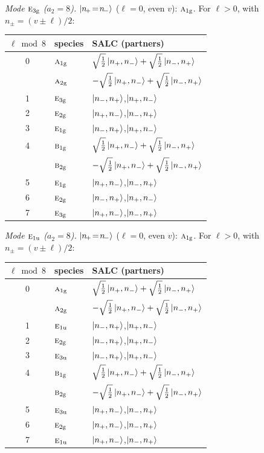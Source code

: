 \documentclass[11pt]{article}
\newcommand{\irr}[1]{\text{\normalfont\scshape #1}}
\newcommand{\ptag}[1]{\mathrm{#1}}
\begin{document}
\emph{Mode $\irr{e}_{3\ptag{g}}$ ($a_2=8$).} $\ket{n_{\!+}\!=\!n_{\!-}}$ ($\ell=0$, even $v$): $\irr{a}_{1\ptag{g}}$. For $\ell>0$, with $n_\pm=(v\pm\ell)/2$:
\begin{longtable}{c l l}\hline $\ell\bmod 8$ & species & SALC (partners)\\ \hline\endhead
0 & $\irr{a}_{1\ptag{g}}$ & $\sqrt{\tfrac{1}{2}}\ket{n_+,n_-}+\sqrt{\tfrac{1}{2}}\ket{n_-,n_+}$\\
 & $\irr{a}_{2\ptag{g}}$ & $-\sqrt{\tfrac{1}{2}}\ket{n_+,n_-}+\sqrt{\tfrac{1}{2}}\ket{n_-,n_+}$\\
1 & $\irr{e}_{3\ptag{g}}$ & $\ket{n_-,n_+}$,\quad $\ket{n_+,n_-}$\\
2 & $\irr{e}_{2\ptag{g}}$ & $\ket{n_+,n_-}$,\quad $\ket{n_-,n_+}$\\
3 & $\irr{e}_{1\ptag{g}}$ & $\ket{n_-,n_+}$,\quad $\ket{n_+,n_-}$\\
4 & $\irr{b}_{1\ptag{g}}$ & $\sqrt{\tfrac{1}{2}}\ket{n_+,n_-}+\sqrt{\tfrac{1}{2}}\ket{n_-,n_+}$\\
 & $\irr{b}_{2\ptag{g}}$ & $-\sqrt{\tfrac{1}{2}}\ket{n_+,n_-}+\sqrt{\tfrac{1}{2}}\ket{n_-,n_+}$\\
5 & $\irr{e}_{1\ptag{g}}$ & $\ket{n_+,n_-}$,\quad $\ket{n_-,n_+}$\\
6 & $\irr{e}_{2\ptag{g}}$ & $\ket{n_-,n_+}$,\quad $\ket{n_+,n_-}$\\
7 & $\irr{e}_{3\ptag{g}}$ & $\ket{n_+,n_-}$,\quad $\ket{n_-,n_+}$\\
\hline\end{longtable}

\emph{Mode $\irr{e}_{1\ptag{u}}$ ($a_2=8$).} $\ket{n_{\!+}\!=\!n_{\!-}}$ ($\ell=0$, even $v$): $\irr{a}_{1\ptag{g}}$. For $\ell>0$, with $n_\pm=(v\pm\ell)/2$:
\begin{longtable}{c l l}\hline $\ell\bmod 8$ & species & SALC (partners)\\ \hline\endhead
0 & $\irr{a}_{1\ptag{g}}$ & $\sqrt{\tfrac{1}{2}}\ket{n_+,n_-}+\sqrt{\tfrac{1}{2}}\ket{n_-,n_+}$\\
 & $\irr{a}_{2\ptag{g}}$ & $-\sqrt{\tfrac{1}{2}}\ket{n_+,n_-}+\sqrt{\tfrac{1}{2}}\ket{n_-,n_+}$\\
1 & $\irr{e}_{1\ptag{u}}$ & $\ket{n_-,n_+}$,\quad $\ket{n_+,n_-}$\\
2 & $\irr{e}_{2\ptag{g}}$ & $\ket{n_-,n_+}$,\quad $\ket{n_+,n_-}$\\
3 & $\irr{e}_{3\ptag{u}}$ & $\ket{n_-,n_+}$,\quad $\ket{n_+,n_-}$\\
4 & $\irr{b}_{1\ptag{g}}$ & $\sqrt{\tfrac{1}{2}}\ket{n_+,n_-}+\sqrt{\tfrac{1}{2}}\ket{n_-,n_+}$\\
 & $\irr{b}_{2\ptag{g}}$ & $-\sqrt{\tfrac{1}{2}}\ket{n_+,n_-}+\sqrt{\tfrac{1}{2}}\ket{n_-,n_+}$\\
5 & $\irr{e}_{3\ptag{u}}$ & $\ket{n_+,n_-}$,\quad $\ket{n_-,n_+}$\\
6 & $\irr{e}_{2\ptag{g}}$ & $\ket{n_+,n_-}$,\quad $\ket{n_-,n_+}$\\
7 & $\irr{e}_{1\ptag{u}}$ & $\ket{n_+,n_-}$,\quad $\ket{n_-,n_+}$\\
\hline\end{longtable}
\end{document}
